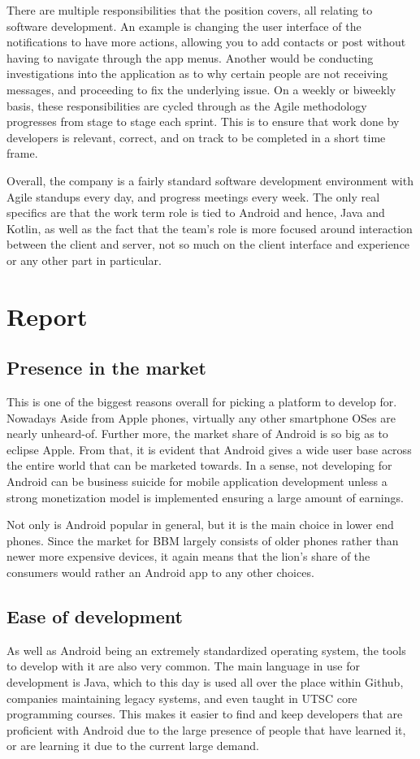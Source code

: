 \documentclass[12pt, letterpaper]{article}
\begin{document}
There are multiple responsibilities that the position covers, all relating
to software development. An example is changing the user interface of the 
notifications to have more actions, allowing you to add contacts or post 
without having to navigate through the app menus. Another would be 
conducting investigations into the application as to why certain people 
are not receiving messages, and proceeding to fix the underlying issue.
On a weekly or biweekly basis, these responsibilities are cycled through
as the Agile methodology progresses from stage to stage each sprint.
This is to ensure that work done by developers is relevant, correct, and on
track to be completed in a short time frame.

Overall, the company is a fairly standard software development environment
with Agile standups every day, and progress meetings every week. The only 
real specifics are that the work term role is tied to Android and hence, 
Java and Kotlin, as well as the fact that the team's role is more focused 
around interaction between the client and server, not so much on the client
interface and experience or any other part in particular.

\section{Report}

\subsection{Presence in the market}
This is one of the biggest reasons overall for picking a platform to
develop for. Nowadays Aside from Apple phones, virtually any other
smartphone OSes are nearly unheard-of. Further more, the market share of
Android is so big as to eclipse Apple\cite{marketshare}. From that, it
is evident that Android gives a wide user base across the entire world
that can be marketed towards. In a sense, not developing for Android can
be business suicide for mobile application development unless a strong
monetization model is implemented ensuring a large amount of earnings.

Not only is Android popular in general, but it is the main choice in
lower end phones. Since the market for BBM largely consists of older
phones rather than newer more expensive devices, it again means that
the lion's share of the consumers would rather an Android app to 
any other choices.

\subsection{Ease of development}
As well as Android being an extremely standardized operating system, the
tools to develop with it are also very common. The main language in use
for development is Java, which to this day is used all over the place
\cite{java} within Github, companies maintaining legacy systems, and even
taught in UTSC core programming courses. This makes it easier to find and
keep developers that are proficient with Android due to the large presence
of people that have learned it, or are learning it due to the current large
demand.
\end{document}
